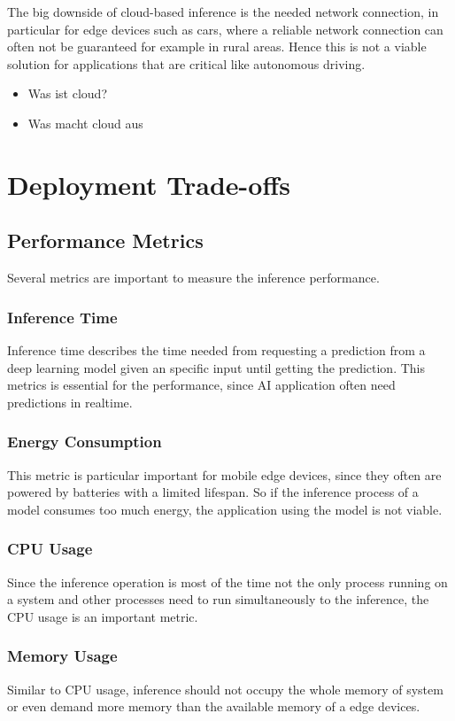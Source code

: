 The big downside of cloud-based inference is the needed network connection, in particular for edge devices such as cars, where a reliable network connection can often not be guaranteed for example in rural areas. Hence this is not a viable solution for applications that are critical like autonomous driving.
\begin{itemize}
    \item Was ist cloud?
    \item Was macht cloud aus
\end{itemize}
\section{Deployment Trade-offs}

\subsection{Performance Metrics}
Several metrics are important to measure the inference performance.
\subsubsection{Inference Time}
Inference time describes the time needed from requesting a prediction from a deep learning model given an specific input until getting the prediction.
This metrics is essential for the performance, since AI application often need predictions in realtime.
\subsubsection{Energy Consumption}
This metric is particular important for mobile edge devices, since they often are powered by batteries with a limited lifespan. So if the inference process of a model consumes too much energy, the application using the model is not viable.
\subsubsection{CPU Usage}
Since the inference operation is most of the time not the only process running on a system and other processes need to run simultaneously to the inference, the CPU usage is an important metric.
\subsubsection{Memory Usage}
Similar to CPU usage, inference should not occupy the whole memory of system or even demand more memory than the available memory of a edge devices.
